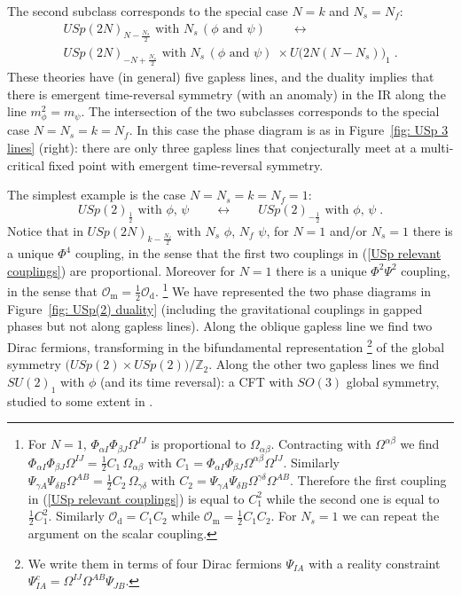 \documentclass[a4paper, 12pt]{article}
\numberwithin{equation}{section}
\newcommand{\be}{\begin{equation}} \newcommand{\ee}{\end{equation}}
\newcommand{\cO}{\mathcal{O}}
\newcommand{\bZ}{\mathbb{Z}}
\begin{document}
The second subclass corresponds to the special case $N=k$ and $N_s = N_f$:
\begin{multline}
USp(2N)_{N - \frac{N_s}2} \text{ with } N_s\, (\phi \text{ and } \psi) \qquad\longleftrightarrow \\
USp(2N)_{-N + \frac{N_s}2} \text{ with } N_s\, (\phi \text{ and } \psi) \; \times U\big( 2N(N-N_s) \big)_1 \;.
\end{multline}
These theories have (in general) five gapless lines, and the duality implies that there is emergent time-reversal symmetry (with an anomaly) in the IR along the line $m_\phi^2 = m_\psi$. The intersection of the two subclasses corresponds to the special case $N=N_s = k = N_f$. In this case the phase diagram is as in Figure~\ref{fig: USp 3 lines} (right): there are only three gapless lines that conjecturally meet at a multi-critical fixed point with emergent time-reversal symmetry.

The simplest example is the case $N=N_s = k = N_f = 1$:
\be
\label{USp(2) duality}
USp(2)_{\frac12} \text{ with $\phi$, $\psi$} \qquad\longleftrightarrow\qquad USp(2)_{-\frac12} \text{ with $\phi$, $\psi$} \;.
\ee
Notice that in $USp(2N)_{k - \frac{N_f}2}$ with $N_s$ $\phi$, $N_f$ $\psi$, for $N=1$ and/or $N_s=1$ there is a unique $\Phi^4$ coupling, in the sense that the first two couplings in (\ref{USp relevant couplings}) are proportional. Moreover for $N=1$ there is a unique $\Phi^2\Psi^2$ coupling, in the sense that $\cO_\text{m} = \frac12 \cO_\text{d}$.%
\footnote{For $N=1$, $\Phi_{\alpha I} \Phi_{\beta J} \Omega^{IJ}$ is proportional to $\Omega_{\alpha\beta}$. Contracting with $\Omega^{\alpha\beta}$ we find $\Phi_{\alpha I} \Phi_{\beta J} \Omega^{IJ} = \frac12 C_1\, \Omega_{\alpha\beta}$ with $C_1 = \Phi_{\alpha I} \Phi_{\beta J} \Omega^{\alpha\beta} \Omega^{IJ}$. Similarly $\Psi_{\gamma A} \Psi_{\delta B} \Omega^{AB} = \frac12 C_2\, \Omega_{\gamma\delta}$ with $C_2 = \Psi_{\gamma A} \Psi_{\delta B} \Omega^{\gamma\delta} \Omega^{AB}$. Therefore the first coupling in (\ref{USp relevant couplings}) is equal to $C_1^2$ while the second one is equal to $\frac12 C_1^2$. Similarly $\cO_\text{d} = C_1 C_2$ while $\cO_\text{m} = \frac12 C_1 C_2$. For $N_s=1$ we can repeat the argument on the scalar coupling.}
We have represented the two phase diagrams in Figure~\ref{fig: USp(2) duality} (including the gravitational couplings in gapped phases but not along gapless lines). Along the oblique gapless line we find two Dirac fermions, transforming in the bifundamental representation%
\footnote{We write them in terms of four Dirac fermions $\Psi_{IA}$ with a reality constraint $\Psi_{IA}^c = \Omega^{IJ} \Omega^{AB} \Psi_{JB}$.}
of the global symmetry $\big( USp(2) \times USp(2)\big) / \bZ_2$.
Along the other two gapless lines we find $SU(2)_1$ with $\phi$ (and its time reversal): a CFT with $SO(3)$ global symmetry, studied to some extent in \cite{Aharony:2016jvv}.
\end{document}
